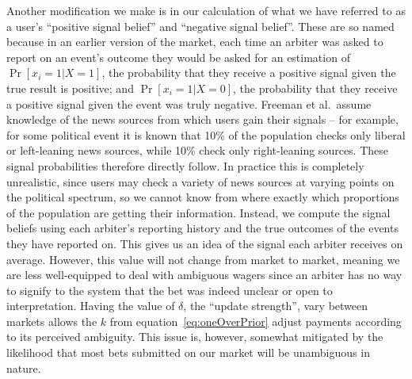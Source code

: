 Another modification we make is in our calculation of what we have referred to
as a user's ``positive signal belief'' and ``negative signal belief''. These
are so named because in an earlier version of the market, each time an arbiter
was asked to report on an event's outcome they would be asked for an estimation
of $\Pr[x_i=1|X=1]$, the probability that they receive a positive signal given
the true result is positive; and $\Pr[x_i=1|X=0]$, the probability that they
receive a positive signal given the event was truly negative. Freeman et al.\
assume knowledge of the news sources from which users gain their signals -- for
example, for some political event it is known that 10\% of the population
checks only liberal or left-leaning news sources, while 10\% check only
right-leaning sources. These signal probabilities therefore directly follow. In
practice this is completely unrealistic, since users may check a variety of
news sources at varying points on the political spectrum, so we cannot know
from where exactly which proportions of the population are getting their
information. Instead, we compute the signal beliefs using each arbiter's
reporting history and the true outcomes of the events they have reported on.
This gives us an idea of the signal each arbiter receives on average. However,
this value will not change from market to market, meaning we are less
well-equipped to deal with ambiguous wagers since an arbiter has no way to
signify to the system that the bet was indeed unclear or open to
interpretation. Having the value of $\delta$, the ``update strength'', vary
between markets allows the $k$ from equation~\eqref{eq:oneOverPrior} adjust
payments according to its perceived ambiguity. This issue is, however, somewhat
mitigated by the likelihood that most bets submitted on our market will be
unambiguous in nature.

